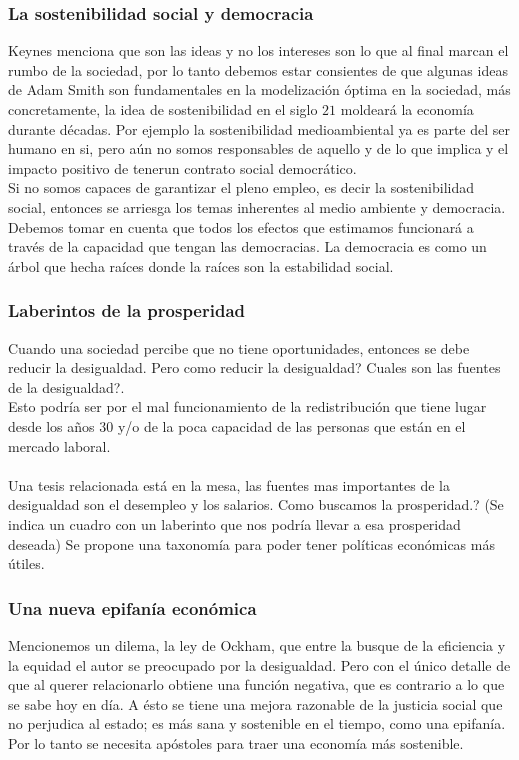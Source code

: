 \begin{multicols}{2}
\subsubsection*{La sostenibilidad social y democracia}
Keynes menciona que son las ideas y no los intereses son lo que al final marcan el rumbo de la sociedad,  por lo tanto debemos estar consientes de que algunas ideas de Adam Smith son fundamentales en la modelización óptima en la sociedad, más concretamente, la idea de sostenibilidad en el siglo $21$ moldeará la economía durante décadas. Por ejemplo la sostenibilidad medioambiental ya es parte del ser humano en si, pero aún no somos responsables de aquello y de lo que implica y el impacto positivo de tenerun contrato social democrático.\\
Si no somos capaces de garantizar el pleno empleo, es decir la sostenibilidad social, entonces se arriesga los temas inherentes al medio ambiente y  democracia. Debemos tomar en cuenta que todos los efectos que estimamos funcionará a través de la capacidad que tengan las democracias. La democracia es como un árbol que hecha raíces donde la raíces son la estabilidad social.

\subsubsection*{Laberintos de la prosperidad}
Cuando una sociedad percibe que no tiene oportunidades, entonces se debe reducir la desigualdad. Pero como reducir la desigualdad? Cuales son las fuentes de la desigualdad?.\\
Esto podría ser por el mal funcionamiento de la redistribución que tiene lugar desde los años $30$ y/o de la poca capacidad de las personas que están en el mercado laboral.\\\\
Una tesis relacionada está en la mesa, las fuentes mas importantes de la desigualdad son el desempleo y los salarios.  Como buscamos la prosperidad.? (Se indica un cuadro con un laberinto que nos podría llevar a esa
prosperidad deseada) Se propone una taxonomía para poder tener políticas económicas más útiles.

\subsubsection*{Una nueva epifanía económica}
Mencionemos un dilema, la ley de Ockham, que entre la busque de la eficiencia y la equidad el autor se
preocupado por la desigualdad. Pero con el único detalle de que al querer relacionarlo obtiene una función negativa, que es contrario a lo que se sabe hoy en día. A ésto se tiene una mejora razonable de la justicia social que no perjudica al estado; es más sana y sostenible en el tiempo, como una epifanía. Por lo tanto se necesita apóstoles para traer una economía más sostenible.


\end{multicols}
